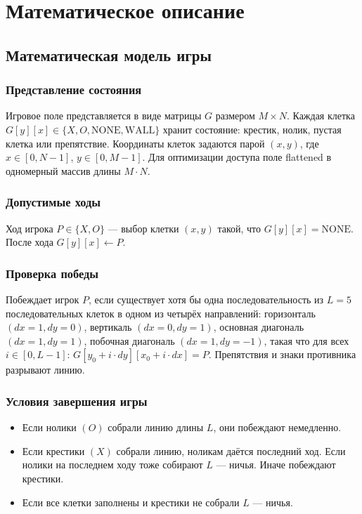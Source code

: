 \documentclass[a4paper,14pt]{extreport}
\begin{document}
\chapter{Математическое описание}
\section{Математическая модель игры}
\subsection{Представление состояния}
Игровое поле представляется в виде матрицы $G$ размером $M \times N$. Каждая клетка $G[y][x] \in \{X, O, \text{NONE}, \text{WALL}\}$ хранит состояние: крестик, нолик, пустая клетка или препятствие. Координаты клеток задаются парой $(x, y)$, где $x \in [0, N-1]$, $y \in [0, M-1]$. Для оптимизации доступа поле flattened в одномерный массив длины $M \cdot N$.

\subsection{Допустимые ходы}
Ход игрока $P \in \{X, O\}$ — выбор клетки $(x, y)$ такой, что $G[y][x] = \text{NONE}$. После хода $G[y][x] \leftarrow P$.

\subsection{Проверка победы}
Побеждает игрок $P$, если существует хотя бы одна последовательность из $L = 5$ последовательных клеток в одном из четырёх направлений: горизонталь $(dx=1, dy=0)$, вертикаль $(dx=0, dy=1)$, основная диагональ $(dx=1, dy=1)$, побочная диагональ $(dx=1, dy=-1)$, такая что для всех $i \in [0, L-1]$: $G[y_0 + i \cdot dy][x_0 + i \cdot dx] = P$. Препятствия и знаки противника разрывают линию.

\subsection{Условия завершения игры}
\begin{itemize}
    \item Если нолики $(O)$ собрали линию длины $L$, они побеждают немедленно.
    \item Если крестики $(X)$ собрали линию, ноликам даётся последний ход. Если нолики на последнем ходу тоже собирают $L$ — ничья. Иначе побеждают крестики.
    \item Если все клетки заполнены и крестики не собрали $L$ — ничья.
\end{itemize}
\end{document}
